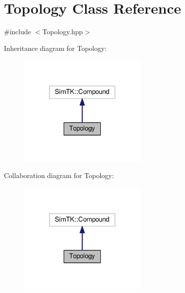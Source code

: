 \hypertarget{classTopology}{}\section{Topology Class Reference}
\label{classTopology}


{\ttfamily \#include $<$Topology.\+hpp$>$}



Inheritance diagram for Topology\+:\nopagebreak
\begin{figure}[H]
\begin{center}
\leavevmode
\includegraphics[width=180pt]{classTopology__inherit__graph}
\end{center}
\end{figure}


Collaboration diagram for Topology\+:\nopagebreak
\begin{figure}[H]
\begin{center}
\leavevmode
\includegraphics[width=180pt]{classTopology__coll__graph}
\end{center}
\end{figure}
